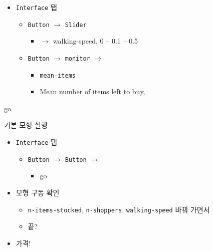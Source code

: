 \documentclass[hyperref={unicode}]{beamer}
\begin{document}
\begin{frame}[fragile]
\begin{itemize}
\item \verb|Interface| 탭
	\begin{itemize}
	\item \verb|Button| $\rightarrow$ \verb|Slider| 
		\begin{itemize}
		\item $\rightarrow$ walking-speed, 0 -- 0.1 -- 0.5
		\end{itemize}
	\item \verb|Button| $\rightarrow$ \verb|monitor| $\rightarrow$ 
		\begin{itemize}
		\item \verb|mean-items|
		\item Mean number of items left to buy, 
		\end{itemize}	
	\end{itemize}
\end{itemize}	
\end{frame}
go
\begin{frame}[fragile]{기본 모형 실행}
\begin{itemize}
\item \verb|Interface| 탭
	\begin{itemize}
	\item \verb|Button| $\rightarrow$ \verb|Button| $\rightarrow$ 
		\begin{itemize}
		\item go
		\end{itemize}	
	\end{itemize}
\item 모형 구동 확인
	\begin{itemize}
	\item \verb|n-items-stocked|, \verb|n-shoppers|, \verb|walking-speed| 바꿔 가면서
	\item 끝?
	\end{itemize}
\item 가격!
\end{itemize}	
\end{frame}
\end{document}
